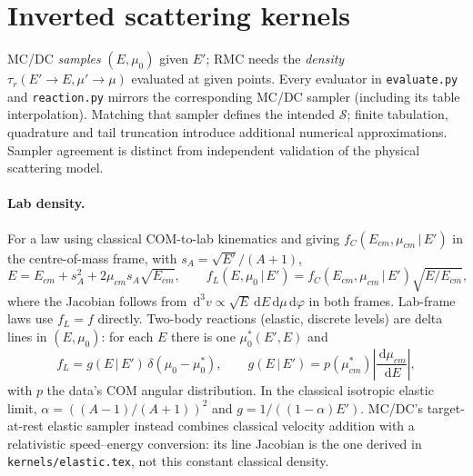 \documentclass[11pt]{article}
\newcommand{\dd}{\,\mathrm{d}}
\begin{document}
\section{Inverted scattering kernels}

MC/DC \emph{samples} $(E,\mu_0)$ given $E'$; RMC needs the \emph{density}
$\tau_r(E'\to E,\mu'\to\mu)$ evaluated at given points. Every evaluator in
\texttt{evaluate.py} and \texttt{reaction.py} mirrors the corresponding MC/DC sampler
(including its table interpolation). Matching that sampler defines the intended
$\mathcal S$; finite tabulation, quadrature and tail truncation introduce additional
numerical approximations. Sampler agreement is distinct from independent validation
of the physical scattering model.

\paragraph{Lab density.} For a law using classical COM-to-lab kinematics and giving
$f_C(E_{cm},\mu_{cm}\,|\,E')$ in the
centre-of-mass frame, with $s_A=\sqrt{E'}/(A+1)$,
\begin{equation}
  E=E_{cm}+s_A^2+2\mu_{cm}s_A\sqrt{E_{cm}},\qquad
  f_L(E,\mu_0\,|\,E')=f_C(E_{cm},\mu_{cm}\,|\,E')\sqrt{E/E_{cm}} ,
\end{equation}
where the Jacobian follows from $\dd^3v\propto\sqrt{E}\dd E\dd\mu\dd\varphi$ in both
frames. Lab-frame laws use $f_L=f$ directly. Two-body reactions (elastic, discrete
levels) are delta lines in $(E,\mu_0)$: for each $E$ there is one $\mu_0^*(E',E)$ and
\begin{equation}
  f_L=g(E\,|\,E')\,\delta(\mu_0-\mu_0^*),\qquad
  g(E\,|\,E')=p(\mu_{cm}^*)\left|\frac{\dd\mu_{cm}}{\dd E}\right|,
\end{equation}
with $p$ the data's COM angular distribution. In the classical isotropic elastic
limit, $\alpha=((A-1)/(A+1))^2$ and $g=1/((1-\alpha)E')$.
MC/DC's target-at-rest elastic sampler instead combines classical velocity addition
with a relativistic speed--energy conversion: its line Jacobian is the one derived
in \texttt{kernels/elastic.tex}, not this constant classical density.
\end{document}
